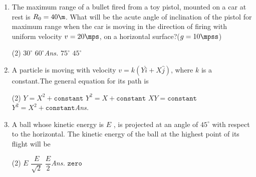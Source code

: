 \documentclass{article}
\newcommand{\ans}{\textcolor{red!95}{\textit{\quad Ans.}}}
\begin{document}
\begin{enumerate}
	\item The maximum range of a bullet fired from a toy pistol, mounted on a car at rest is $R_0 = 40 \m$. What will be the acute angle of inclination of the pistol for maximum range when the car is moving in the direction of firing with uniform velocity $v = 20 \mps$, on a horizontal surface?($g=10\mpss$)
	\begin{tasks}(2)
		\task $30^\circ$
		\task $60^\circ$\ans
		\task $75^\circ$
		\task $45^\circ$
	\end{tasks}
	
	\item A particle is moving with velocity $v = k (Y \hat{i}+ X \hat{j})$, where $k$ is a constant.The general equation for its path is
	\begin{tasks}(2)
		\task $Y=X^2 + \texttt{constant}$
		\task $Y^2=X + \texttt{constant}$
		\task $XY=\texttt{constant}$
		\task $Y^2=X^2 + \texttt{constant}$\ans
	\end{tasks}
	
	\item A ball whose kinetic energy is $E$ , is projected at an angle of $45^\circ$ with respect to the horizontal. The kinetic energy of the ball at the highest point of its flight will be
	\begin{center}
	\end{center}
	\begin{tasks}(2)
		\task $E$
		\task $\dfrac{E}{\sqrt{2}}$
		\task $\dfrac{E}{2}$\ans
		\task $\texttt{zero}$
	\end{tasks}		
	

\end{enumerate}
\end{document}
